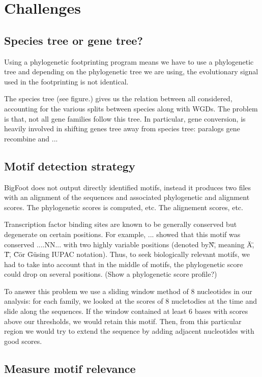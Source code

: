 \section{Challenges}

\subsection{Species tree or gene tree?}


Using a phylogenetic footprinting program means we have to use a phylogenetic tree and depending on the phylogenetic tree we are using, the evolutionary signal used in the footprinting is not identical.

The species tree (see figure.) gives us the relation between all considered, accounting for the various splits between species along with WGDs. The problem is that, not all gene families follow this tree. In particular, gene conversion, is heavily involved in shifting genes tree away from species tree: paralogs gene recombine and ...

\subsection{Motif detection strategy}


BigFoot does not output directly identified motifs, instead it produces two files with an alignment of the sequences and associated phylogenetic and alignment scores. The phylogenetic scores is computed, etc. The alignement scores, etc.

Transcription factor binding sites are known to be generally conserved but degenerate on certain positions. For example, ... showed that this motif was conserved ....NN... with two highly variable positions (denoted by\"N\", meaning \"A\", \"T\", \"C\" or \"G\" using IUPAC notation). Thus, to seek biologically relevant motifs, we had to take into account that in the middle of motifs, the phylogenetic score could drop on several positions. (Show a phylogenetic score profile?)

To answer this problem we use a sliding window method of 8 nucleotides in our analysis: for each family, we looked at the scores of 8 nucletodies at the time and slide along the sequences. If the window contained at least 6 bases with scores above our thresholds, we would retain this motif. Then, from this particular region we would try to extend the sequence by adding adjacent nucleotides with good scores.

\subsection{Measure motif relevance}


